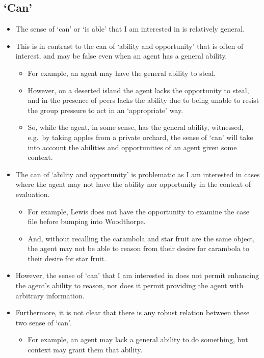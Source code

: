 \documentclass[10pt]{article}
\begin{document}
\newpage

\subsection{`Can'}
\label{sec:can}

\begin{itemize}
\item The sense of `can' or `is able' that I am interested in is relatively general.
\item This is in contrast to the can of `ability and opportunity' that is often of interest, and may be false even when an agent has a general ability.
  \begin{itemize}
  \item For example, an agent may have the general ability to steal.
  \item However, on a deserted island the agent lacks the opportunity to steal, and in the presence of peers lacks the ability due to being unable to resist the group pressure to act in an `appropriate' way.
  \item So, while the agent, in some sense, has the general ability, witnessed, e.g.\ by taking apples from a private orchard, the sense of `can' will take into account the abilities and opportunities of an agent given some context.
  \end{itemize}
\item The can of `ability and opportunity' is problematic as I am interested in cases where the agent may not have the ability nor opportunity in the context of evaluation.
  \begin{itemize}
  \item For example, Lewis does not have the opportunity to examine the case file before bumping into Woodthorpe.
  \item And, without recalling the carambola and star fruit are the same object, the agent may not be able to reason from their desire for carambola to their desire for star fruit.
  \end{itemize}
\item However, the sense of `can' that I am interested in does not permit enhancing the agent's ability to reason, nor does it permit providing the agent with arbitrary information.
\item Furthermore, it is not clear that there is any robust relation between these two sense of `can'.
  \begin{itemize}
  \item For example, an agent may lack a general ability to do something, but context may grant them that ability.

\end{itemize}
\end{itemize}
\end{document}
